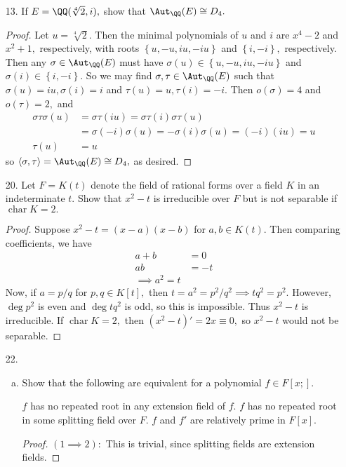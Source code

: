 \documentclass{article}
\DeclareMathOperator{\cha}{char}
\begin{document}
\begin{itemize}
	\item[13.] If $E=\QQ(\sqrt[4]{2}, i),$ show that $\Aut_{\QQ}(E)\cong D_4.$
		\begin{proof}
			Let $u=\sqrt[4]{2}.$ Then the minimal polynomials of $u$ and $i$ are $x^4-2$ and $x^2+1,$ respectively, with roots $\left\{ u, -u, iu, -iu \right\}$ and $\left\{ i, -i \right\},$ respectively. Then any $\sigma\in \Aut_\QQ(E)$ must have $\sigma(u)\in \left\{ u, -u, iu, -iu \right\}$ and $\sigma(i) \in \left\{ i, -i \right\}.$ So we may find $\sigma, \tau\in \Aut_\QQ(E)$ such that $\sigma(u)=iu, \sigma(i)=i$ and $\tau(u)=u, \tau(i)=-i.$ Then $o(\sigma) = 4$ and $o(\tau) = 2,$ and
			\begin{align*}
				\sigma\tau\sigma(u) &= \sigma\tau(iu) = \sigma\tau(i)\sigma\tau(u) \\
				&= \sigma(-i)\sigma(u) = -\sigma(i)\sigma(u) = (-i)(iu) = u \\
				\tau(u) &= u
			\end{align*}
			so $\left< \sigma, \tau\right>=\Aut_\QQ(E)\cong D_4,$ as desired.
		\end{proof}

	\item[20.] Let $F=K(t)$ denote the field of rational forms over a field $K$ in an indeterminate $t.$ Show that $x^2-t$ is irreducible over $F$ but is not separable if $\cha K=2.$
		\begin{proof}
			Suppose $x^2-t=(x-a)(x-b)$ for $a, b\in K(t).$ Then comparing coefficients, we have
			\begin{align*}
				a+b &= 0 \\
				ab &= -t \\
				\implies a^2=t
			\end{align*}
			Now, if $a=p/q$ for $p, q\in K[t],$ then $t=a^2=p^2/q^2\implies tq^2 = p^2.$ However, $\deg p^2$ is even and $\deg tq^2$ is odd, so this is impossible. Thus $x^2-t$ is irreducible. If $\cha K=2,$ then $(x^2-t)' = 2x \equiv 0,$ so $x^2-t$ would not be separable.
		\end{proof}

	\item[22.] 
		\begin{enumerate}[(a)]
			\item Show that the following are equivalent for a polynomial $f\in F[x;].$ 
				\begin{enumerate}[(1)]
					\ii $f$ has no repeated root in any extension field of $f.$
					\ii $f$ has no repeated root in some splitting field over $F.$
					\ii $f$ and $f'$ are relatively prime in $F[x].$
				\end{enumerate}
				\begin{proof}
					$(1\implies 2):$ This is trivial, since splitting fields are extension fields.


\end{proof}
\end{enumerate}
\end{itemize}
\end{document}

